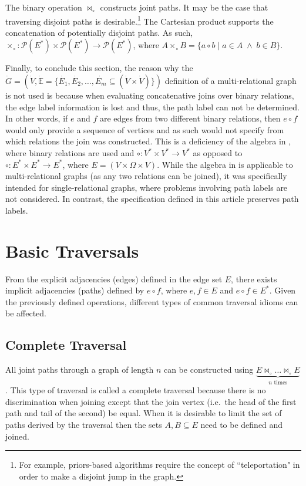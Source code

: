 \documentclass[10pt,conference,letterpaper]{IEEEtran}
\newcommand{\rar}{\rightarrow}
\newcommand{\mbb}{\mathbb}
\newcommand{\mca}{\mathcal}
\newcommand{\join}{\bowtie_\circ}
\newcommand{\disjoin}{\times_\circ}
\begin{document}
The binary operation $\join$ constructs joint paths. It may be the case that traversing disjoint paths is desirable.\footnote{For example, priors-based algorithms require the concept of ``teleportation" in order to make a disjoint jump in the graph.} The Cartesian product supports the concatenation of potentially disjoint paths. As such, $\disjoin: \mca{P}(E^*) \times \mca{P}(E^*) \rar \mca{P}(E^*)$, where $A \disjoin B = \{a \circ b \; | \; a \in A \; \wedge \; b \in B\}$.

Finally, to conclude this section, the reason why the $\dot{G}= (\dot{V}, \dot{\mbb{E}} = \{\dot{E_1}, \dot{E_2}, \ldots, \dot{E_m} \subseteq (\dot{V} \times \dot{V})\})$ definition of a multi-relational graph is not used is because when evaluating concatenative joins over binary relations, the edge label information is lost and thus, the path label can not be determined. In other words, if $e$ and $f$ are edges from two different binary relations, then $e \circ f$ would only provide a sequence of vertices and as such would not specify from which relations the join was constructed. This is a deficiency of the algebra in \cite{graphalg:russling1995}, where binary relations are used and $\circ: V^* \times V^* \rar V^*$ as opposed to $\circ: E^* \times E^* \rar E^*$, where $E = (V \times \Omega \times V)$. While the algebra in \cite{graphalg:russling1995} is applicable to multi-relational graphs (as any two relations can be joined), it was specifically intended for single-relational graphs, where problems involving path labels are not considered. In contrast, the specification defined in this article preserves path labels.

\section{Basic Traversals\label{sec:basic}}

From the explicit adjacencies (edges) defined in the edge set $E$, there exists implicit adjacencies (paths) defined by $e \circ f$, where $e,f \in E$ and $e \circ f \in E^*$. Given the previously defined operations, different types of common traversal idioms can be affected. 

\subsection{Complete Traversal}

All joint paths through a graph of length $n$ can be constructed using $\underbrace{E \join \ldots \join E}_{n \text{ times}}$. This type of traversal is called a complete traversal because there is no discrimination when joining except that the join vertex (i.e.~the head of the first path and tail of the second) be equal. When it is desirable to limit the set of paths derived by the traversal then the sets $A,B \subseteq E$ need to be defined and joined.
\end{document}
